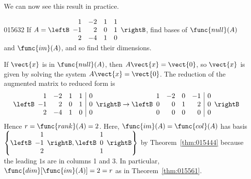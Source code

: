 We can now see this result in practice. 

\begin{example}{}{015632}
If $A = 
\leftB \begin{array}{rrrr}
1 & -2 & 1 & 1 \\
-1 & 2 & 0 & 1 \\
2 & -4 & 1 & 0
\end{array} \rightB$, find bases of $\func{null}(A)$ and $\func{im}(A)$, and so find their dimensions.

\begin{solution}
If $\vect{x}$ is in $\func{null}(A)$, then $A\vect{x} = \vect{0}$, so $\vect{x}$ is given by solving the system $A\vect{x} = \vect{0}$. The reduction of the augmented matrix to reduced form is
\begin{equation*}
\leftB \begin{array}{rrrr|r}
1 & -2 & 1 & 1 & 0 \\
-1 & 2 & 0 & 1 & 0 \\
2 & -4 & 1 & 0 & 0
\end{array} \rightB
\rightarrow
\leftB \begin{array}{rrrr|r}
1 & -2 & 0 & -1 & 0 \\
0 &  0 & 1 &  2 & 0 \\
0 &  0 & 0 &  0 & 0 
\end{array} \rightB
\end{equation*}
Hence $r = \func{rank}(A) = 2$. Here, $\func{im}(A) = \func{col}(A)$ has basis 
$\left\{
\leftB \begin{array}{r}
1\\
-1\\
2
\end{array} \rightB, \leftB \begin{array}{r}
1\\
0\\
1
\end{array} \rightB
\right\}$ by Theorem~\ref{thm:015444} because the leading $1$s are in columns 1 and 3. In particular, $\func{dim}[\func{im}(A)] = 2 = r$ as in Theorem~\ref{thm:015561}.


\end{solution}
\end{example}
